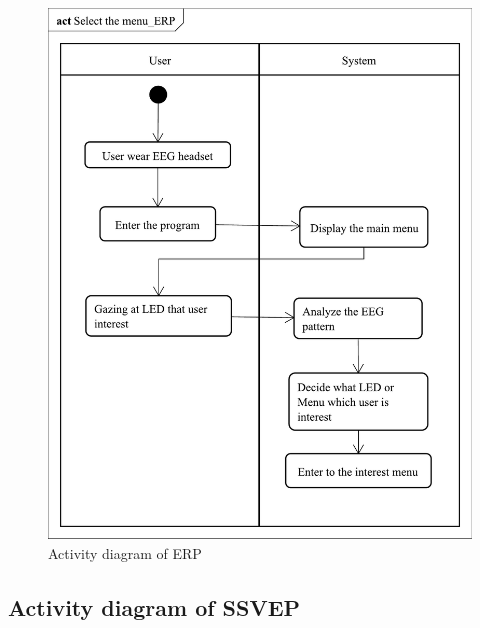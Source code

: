 \begin{figure}[ht]
\centering \includegraphics[scale=0.31]{chapter4/av_ERP.pdf}
\caption{Activity diagram of ERP}
\end{figure}

\subsection{Activity diagram of SSVEP}

